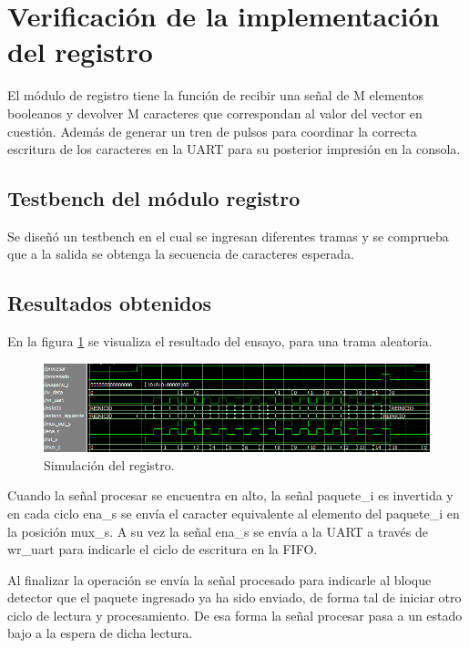 \section{Verificación de la implementación del registro}

	El módulo de registro tiene la función de recibir una señal de M elementos booleanos y devolver M caracteres que correspondan al valor del vector en cuestión. Además de generar un tren de pulsos para coordinar la correcta escritura de los caracteres en la UART para su posterior impresión en la consola.
	
	\subsection{Testbench del módulo registro}
			
		Se diseñó un testbench en el cual se ingresan diferentes tramas y se comprueba que a la salida se obtenga la secuencia de caracteres esperada.		
			
	\subsection{Resultados obtenidos}
				
		En la figura \ref{fig:Test_Registro} se visualiza el resultado del ensayo, para una trama aleatoria.
		
	\begin{figure}[h]
	\centering
	\includegraphics[scale=0.6]{./Figures/Test/Registro}
		\caption{Simulación del registro.}
		\label{fig:Test_Registro}
	\end{figure}
	
	Cuando la señal procesar se encuentra en alto, la señal paquete\_i es invertida y en cada ciclo ena\_s se envía el caracter equivalente al elemento del paquete\_i en la posición mux\_s. A su vez la señal ena\_s se envía a la UART a través de wr\_uart para indicarle el ciclo de escritura en la FIFO.
	
	Al finalizar la operación se envía la señal procesado para indicarle al bloque detector que el paquete ingresado ya ha sido enviado, de forma tal de iniciar otro ciclo de lectura y procesamiento. De esa forma la señal procesar pasa a un estado bajo a la espera de dicha lectura.
	
